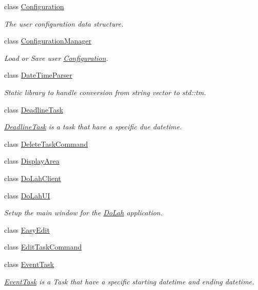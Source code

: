 \begin{DoxyCompactItemize}
class \hyperlink{class_do_lah_1_1_configuration}{Configuration}
\begin{DoxyCompactList}\small\item\em The user configuration data structure. \end{DoxyCompactList}\item 
class \hyperlink{class_do_lah_1_1_configuration_manager}{Configuration\+Manager}
\begin{DoxyCompactList}\small\item\em Load or Save user \hyperlink{class_do_lah_1_1_configuration}{Configuration}. \end{DoxyCompactList}\item 
class \hyperlink{class_do_lah_1_1_date_time_parser}{Date\+Time\+Parser}
\begin{DoxyCompactList}\small\item\em Static library to handle conversion from string vector to std\+::tm. \end{DoxyCompactList}\item 
class \hyperlink{class_do_lah_1_1_deadline_task}{Deadline\+Task}
\begin{DoxyCompactList}\small\item\em \hyperlink{class_do_lah_1_1_deadline_task}{Deadline\+Task} is a task that have a specific due datetime. \end{DoxyCompactList}\item 
class \hyperlink{class_do_lah_1_1_delete_task_command}{Delete\+Task\+Command}
\item 
class \hyperlink{class_do_lah_1_1_display_area}{Display\+Area}
\item 
class \hyperlink{class_do_lah_1_1_do_lah_client}{Do\+Lah\+Client}
\item 
class \hyperlink{class_do_lah_1_1_do_lah_u_i}{Do\+Lah\+U\+I}
\begin{DoxyCompactList}\small\item\em Setup the main window for the \hyperlink{namespace_do_lah}{Do\+Lah} application. \end{DoxyCompactList}\item 
class \hyperlink{class_do_lah_1_1_easy_edit}{Easy\+Edit}
\item 
class \hyperlink{class_do_lah_1_1_edit_task_command}{Edit\+Task\+Command}
\item 
class \hyperlink{class_do_lah_1_1_event_task}{Event\+Task}
\begin{DoxyCompactList}\small\item\em \hyperlink{class_do_lah_1_1_event_task}{Event\+Task} is a Task that have a specific starting datetime and ending datetime. \end{DoxyCompactList}\item 

\end{DoxyCompactItemize}
